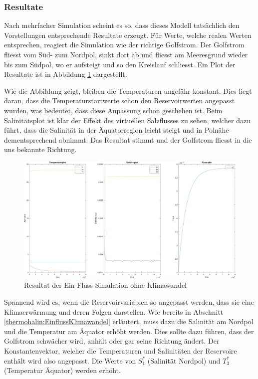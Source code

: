 


\subsubsection{Resultate} 

Nach mehrfacher Simulation scheint es so, dass dieses Modell tatsächlich den Vorstellungen entsprechende Resultate erzeugt. Für Werte, welche realen Werten entsprechen, reagiert die Simulation wie der richtige Golfstrom. Der Golfstrom fliesst vom Süd- zum Nordpol, sinkt dort ab und fliesst am Meeresgrund wieder bis zum Südpol, wo er aufsteigt und so den Kreislauf schliesst. Ein Plot der Resultate ist in Abbildung \ref{thermohalin:3b1f-skript} dargestellt.

Wie die Abbildung zeigt, bleiben die Temperaturen ungefähr konstant. Dies liegt daran, dass die Temperaturstartwerte schon den Reservoirwerten angepasst wurden, was bedeutet, dass diese Anpassung schon geschehen ist. Beim Salinitätsplot ist klar der Effekt des virtuellen Salzflusses zu sehen, welcher dazu führt, dass die Salinität in der Äquatorregion leicht steigt und in Polnähe dementsprechend abnimmt. Das Resultat stimmt und der Golfstrom fliesst in die uns bekannte Richtung.

\begin{figure}
	\centering
	\includegraphics[width=14cm]{thermohalin/Code/graphs/3b1f-skript.pdf}
	\caption{Resultat der Ein-Fluss Simulation ohne Klimawandel}
	\label{thermohalin:3b1f-skript}
\end{figure}

Spannend wird es, wenn die Reservoirvariablen so angepasst werden, dass sie eine Klimaerwärmung und deren Folgen darstellen. Wie bereits in Abschnitt \ref{thermohalin:EinflussKlimawandel} erläutert, muss dazu die Salinität am Nordpol und die Temperatur am Äquator erhöht werden. Dies sollte dazu führen, dass der Golfstrom schwächer wird, anhält oder gar seine Richtung ändert. 
Der Konstantenvektor, welcher die Temperaturen und Salinitäten der Reservoire enthält wird also angepasst.
Die Werte von $S_1^*$ (Salinität Nordpol) und $T_3^*$ (Temperatur Äquator) werden erhöht.

